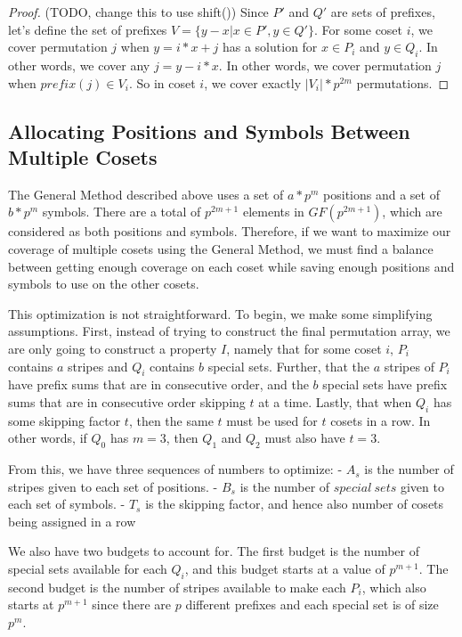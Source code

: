 \begin{proof}

(TODO, change this to use shift())
Since $P'$ and $Q'$ are sets of prefixes, let's define the set of prefixes $V = \{ y-x | x \in P', y \in Q' \}$. For some coset $i$, we cover permutation $j$ when $y = i*x+j$ has a solution for $x \in P_i$ and $y \in Q_i$. In other words, we cover any $j = y - i*x$. In other words, we cover permutation $j$ when $prefix(j) \in V_i$. So in coset $i$, we cover exactly $|V_i| * p^{2m}$ permutations.

\end{proof}

\subsection{Allocating Positions and Symbols Between Multiple Cosets}

The General Method described above uses a set of $a*p^m$ positions and a set of $b*p^m$ symbols. There are a total of $p^{2m+1}$ elements in $GF(p^{2m+1})$, which are considered as both positions and symbols. Therefore, if we want to maximize our coverage of multiple cosets using the General Method, we must find a balance between getting enough coverage on each coset while saving enough positions and symbols to use on the other cosets.

This optimization is not straightforward. To begin, we make some simplifying assumptions. First, instead of trying to construct the final permutation array, we are only going to construct a property $I$, namely that for some coset $i$, $P_i$ contains $a$ stripes and $Q_i$ contains $b$ special sets. Further, that the $a$ stripes of $P_i$ have prefix sums that are in consecutive order, and the $b$ special sets have prefix sums that are in consecutive order skipping $t$ at a time. Lastly, that when $Q_i$ has some skipping factor $t$, then the same $t$ must be used for $t$ cosets in a row. In other words, if $Q_0$ has $m=3$, then $Q_1$ and $Q_2$ must also have $t=3$.

From this, we have three sequences of numbers to optimize:
- $A_s$ is the number of stripes given to each set of positions.
- $B_s$ is the number of $special~sets$ given to each set of symbols.
- $T_s$ is the skipping factor, and hence also number of cosets being assigned in a row

We also have two budgets to account for. The first budget is the number of special sets available for each $Q_i$, and this budget starts at a value of $p^{m+1}$. The second budget is the number of stripes available to make each $P_i$, which also starts at $p^{m+1}$ since there are $p$ different prefixes and each special set is of size $p^m$.

